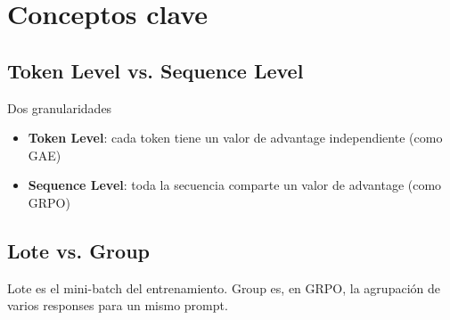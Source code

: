 \section{Conceptos clave}
\subsection{Token Level vs. Sequence Level}
\begin{importantbox}{Dos granularidades}
\begin{itemize}
  \item \textbf{Token Level}: cada token tiene un valor de advantage independiente (como GAE)
  \item \textbf{Sequence Level}: toda la secuencia comparte un valor de advantage (como GRPO)
\end{itemize}
\end{importantbox}

\subsection{Lote vs. Group}
Lote es el mini-batch del entrenamiento. Group es, en GRPO, la agrupación de varios responses para un mismo prompt.

